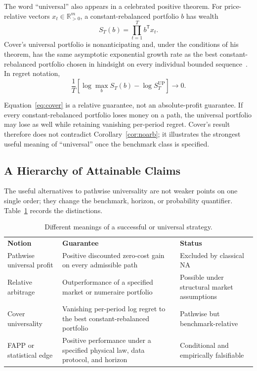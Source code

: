 \documentclass[aps,pra,reprint,superscriptaddress,amsmath,amssymb,floatfix]{revtex4-2}
\theoremstyle{plain}
\theoremstyle{definition}
\theoremstyle{remark}
\begin{document}
The word ``universal'' also appears in a celebrated positive theorem.
For price-relative vectors \(x_t\in\mathbb{R}_{>0}^m\), a constant-rebalanced
portfolio \(b\) has wealth
\[
  S_T(b)=\prod_{t=1}^T b^\mathsf{T}x_t.
\]
Cover's universal portfolio is nonanticipating and, under the conditions of
his theorem, has the same asymptotic exponential growth rate as the best
constant-rebalanced portfolio chosen in hindsight on every individual bounded
sequence~\cite{Cover1991}. In regret notation,
\begin{equation}
  \frac1T\left[
  \log\max_{b}S_T(b)-\log S_T^{\mathrm{UP}}
  \right]\longrightarrow0.
  \label{eq:cover}
\end{equation}

Equation~\eqref{eq:cover} is a relative guarantee, not an absolute-profit
guarantee. If every constant-rebalanced portfolio loses money on a path, the
universal portfolio may lose as well while retaining vanishing per-period
regret. Cover's result therefore does not contradict
Corollary~\ref{cor:noarb}; it illustrates the strongest useful meaning of
``universal'' once the benchmark class is specified.

\subsection{A Hierarchy of Attainable Claims}

The useful alternatives to pathwise universality are not weaker points on one
single order; they change the benchmark, horizon, or probability quantifier.
Table~\ref{tab:hierarchy} records the distinctions.

\begin{table}[ht]
\caption{\label{tab:hierarchy}Different meanings of a successful or universal strategy.}
\centering
\begin{ruledtabular}
\begin{tabular}{p{}p{}p{}}
\textbf{Notion} & \textbf{Guarantee} & \textbf{Status} \\
\colrule
Pathwise universal profit
& Positive discounted zero-cost gain on every admissible path
& Excluded by classical NA \\
Relative arbitrage
& Outperformance of a specified market or numeraire portfolio
& Possible under structural market assumptions \\
Cover universality
& Vanishing per-period log regret to the best constant-rebalanced portfolio
& Pathwise but benchmark-relative \\
FAPP or statistical edge
& Positive performance under a specified physical law, data protocol, and horizon
& Conditional and empirically falsifiable \\
\end{tabular}
\end{ruledtabular}
\end{table}
\end{document}
